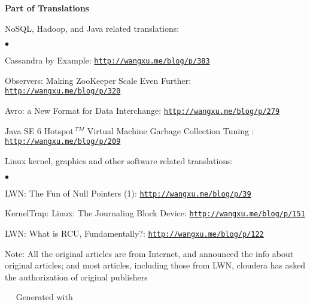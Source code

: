 \documentclass[a4paper,margin,line]{res}
\newenvironment{list1}{
  \begin{list}{\ding{113}}{%
      \setlength{\itemsep}{0in}
      \setlength{\parsep}{0in} \setlength{\parskip}{0in}
      \setlength{\topsep}{0in} \setlength{\partopsep}{0in} 
      \setlength{\leftmargin}{0.17in}}}{\end{list}}
\newenvironment{list2}{
  \begin{list}{$\bullet$}{%
      \setlength{\itemsep}{0in}
      \setlength{\parsep}{0in} \setlength{\parskip}{0in}
      \setlength{\topsep}{0in} \setlength{\partopsep}{0in} 
      \setlength{\leftmargin}{0.2in}}}{\end{list}}
\newcommand{\http}{http:/\hspace{-0.3ex}/}
\newcommand{\hindent}{\mbox{\hspace{8ex}}}
\begin{document}
\begin{resume}
\textbf{Part of Translations}\\
\vspace*{-.1in}
\begin{list1}
\item[] NoSQL, Hadoop, and Java related translations:
\begin{list2}
\vspace*{.05in}
\item Cassandra by Example: \href{http://wangxu.me/blog/p/383}{\tt\http{}wangxu.me/blog/p/383}
\item Observers: Making ZooKeeper Scale Even Further: \href{http://wangxu.me/blog/p/320}{\tt\http{}wangxu.me/blog/p/320}
\item Avro: a New Format for Data Interchange: \href{http://wangxu.me/blog/p/279}{\tt\http{}wangxu.me/blog/p/279}
\item Java SE 6 Hotspot${\,}^{TM}$ Virtual Machine Garbage Collection Tuning : \\
    \hindent\href{http://wangxu.me/blog/p/209}{\tt\http{}wangxu.me/blog/p/209}
\vspace*{.05in}
\end{list2}
\item[] Linux kernel, graphics and other software related translations:
\begin{list2}
\vspace*{.05in}
\item LWN: The Fun of Null Pointers (1): \href{http://wangxu.me/blog/p/39}{\tt\http{}wangxu.me/blog/p/39}
\item KernelTrap: Linux: The Journaling Block Device: \href{http://wangxu.me/blog/p/151}{\tt\http{}wangxu.me/blog/p/151}
\item LWN: What is RCU, Fundamentally?: \enskip\href{http://wangxu.me/blog/p/122}{\tt\http{}wangxu.me/blog/p/122}
\end{list2}
\end{list1}
{\small \textsf{Note: All the original articles are from Internet, and announced the info about original articles; and most articles, including those from LWN, cloudera has asked the authorization of original publishers}}

\end{resume}

\vfill
\vfill
\mbox{ }\hspace{100pt}	\small\Resume\ Generated with 
\end{document}
